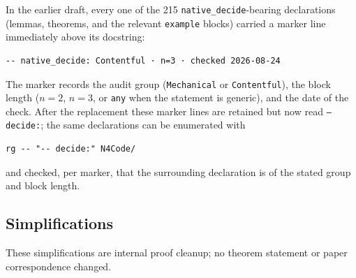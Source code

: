 \documentclass[12pt]{article}
\begin{document}
In the earlier draft, every one of the 215
\texttt{native\_decide}-bearing declarations (lemmas, theorems, and the
relevant \texttt{example} blocks) carried a marker line immediately above
its docstring:
\begin{Verbatim}[frame=single,fontsize=\footnotesize,breaklines=true,breakanywhere=true]
-- native_decide: Contentful · n=3 · checked 2026-08-24
\end{Verbatim}
The marker records the audit group (\texttt{Mechanical} or
\texttt{Contentful}), the block length ($n=2$, $n=3$, or \texttt{any} when the statement is generic), and
the date of the check.
After the replacement these marker lines are retained but now read
\texttt{-- decide:}; the same declarations can be enumerated with
\begin{Verbatim}[frame=single,fontsize=\footnotesize,breaklines=true,breakanywhere=true]
rg -- "-- decide:" N4Code/
\end{Verbatim}
and checked, per marker, that the surrounding declaration is of the stated
group and block length.


\subsection{Simplifications}
\label{sec:simplifications}

These simplifications are internal proof cleanup; no
theorem statement or paper correspondence changed.
\end{document}
